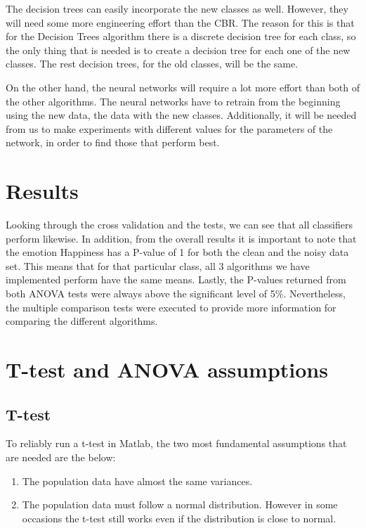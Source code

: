 \documentclass[a4paper,11pt]{article}
\begin{document}
The decision trees can easily incorporate the new classes as well. However,
they will need some more engineering effort than the CBR. The reason for this
is that for the Decision Trees algorithm there is a discrete decision tree for
each class, so the only thing that is needed is to create a decision
tree for each one of the new classes. The rest decision trees, for the old
classes, will be the same. 

On the other hand, the neural networks will require a lot more effort than both
of the other algorithms. The neural networks have to retrain from the beginning
using the new data, the data with the new classes. Additionally, it will be
needed from us to make experiments with different values for the parameters of
the network, in order to find those that perform best.  


\section{Results} 
Looking through the cross validation and the tests, we can see that all
classifiers perform likewise. In addition, from the overall results it is
important to note that the emotion Happiness has a P-value of 1 for both the
clean and the noisy data set. This means that for that particular class, all 3
algorithms we have implemented perform have the same means. Lastly, the
P-values returned from both ANOVA tests were always above the significant level
of 5\%. Nevertheless, the multiple comparison tests were executed to provide
more information for comparing the different algorithms.


\section{T-test and ANOVA assumptions}
\subsection{T-test}
To reliably run a t-test in Matlab, the two most fundamental assumptions that
are needed are the below:

\begin{enumerate}
\item The population data have almost the same variances.
\item The population data must follow a normal distribution. However in some
occasions the t-test still works even if the distribution is close to normal.
\end{enumerate}
\end{document}
